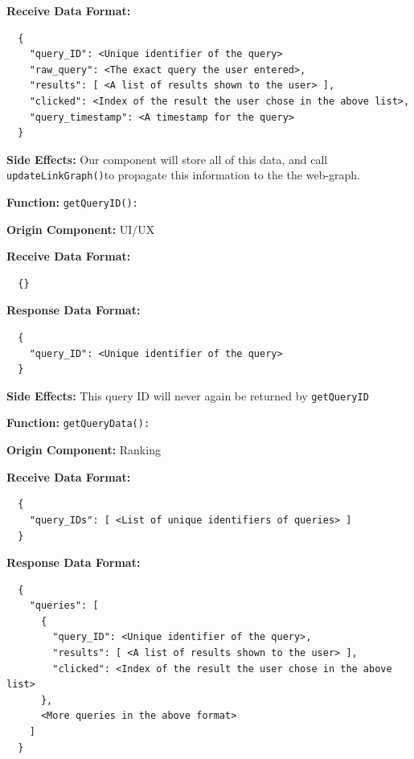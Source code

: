 \smallskip

\textbf{Receive Data Format:} \begin{verbatim}
  {
    "query_ID": <Unique identifier of the query>
    "raw_query": <The exact query the user entered>,
    "results": [ <A list of results shown to the user> ],
    "clicked": <Index of the result the user chose in the above list>,
    "query_timestamp": <A timestamp for the query>
  }
\end{verbatim}

\smallskip

\textbf{Side Effects:} Our component will store all of this data, and call \verb|updateLinkGraph()|to propagate this information to the the web-graph.

\bigskip

\textbf{Function:} \verb|getQueryID():|

\smallskip

\textbf{Origin Component:} UI/UX

\smallskip

\textbf{Receive Data Format:} \begin{verbatim}
  {}
\end{verbatim}

\textbf{Response Data Format:} \begin{verbatim}
  {
    "query_ID": <Unique identifier of the query>
  }
\end{verbatim}

\smallskip

\textbf{Side Effects:} This query ID will never again be returned by \verb|getQueryID|

\bigskip

\textbf{Function:} \verb|getQueryData():|

\smallskip

\textbf{Origin Component:} Ranking

\smallskip

\textbf{Receive Data Format:} \begin{verbatim}
  {
    "query_IDs": [ <List of unique identifiers of queries> ]
  }
\end{verbatim}

\textbf{Response Data Format:} \begin{verbatim}
  {
    "queries": [
      {
        "query_ID": <Unique identifier of the query>,
        "results": [ <A list of results shown to the user> ],
        "clicked": <Index of the result the user chose in the above list>
      }, 
      <More queries in the above format>
    ]
  }
\end{verbatim}

